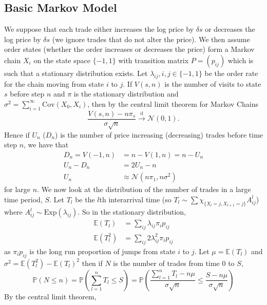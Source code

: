 \documentclass[a4paper,10pt]{article}
\begin{document}
\subsection{Basic Markov Model}
We suppose that each trade either increases the log price by $\delta s$ or decreases the log price by $\delta s$ (we ignore trades that do not alter the price). We then assume order states (whether the order increases or decreases the price) form a Markov chain $X_i$ on the state space $\{-1, 1\}$ with transition matrix $P = (p_{ij})$ which is such that a stationary distribution exists. Let $\lambda_{ij}, i,j \in \{-1, 1\}$ be the order rate for the chain moving from state $i$ to $j$. If $V(s, n)$ is the number of visits to state $s$ before step $n$ and $\pi$ is the stationary distribution and $\sigma^2 = \sum_{i=1}^{\infty}\text{Cov}(X_0, X_i)$, then by the central limit theorem for Markov Chains \cite{markovclt}
\begin{equation}
\frac{V(s, n) - n\pi_s}{\sigma \sqrt{n}} \xrightarrow{\text{d}} \mathcal{N}(0, 1).
\end{equation}
Hence if $U_n$ ($D_n$) is the number of price increasing (decreasing) trades before time step $n$, we have that
\begin{align}
D_n = V(-1, n) &= n - V(1, n) = n - U_n \\
U_n - D_n &= 2U_n - n \\
U_n &\approx  \mathcal{N}(n\pi_1, n\sigma^2)
\end{align}
for large $n$. 
We now look at the distribution of the number of trades in a large time period, $S$. Let $T_l$ be the $l$th interarrival time (so $T_l \sim \sum \chi_{\{X_l = j, X_{l + 1} = j\}} A_{ij}^l $) where $A_{ij}^l \sim \text{Exp}(\lambda_{ij})$. So in the stationary distribution,
\begin{align}
\mathbb{E}(T_l) &= \sum_{ij} \lambda_{ij}\pi_{i}p_{ij}\\
\mathbb{E}(T_l^2) &=  \sum_{ij} 2\lambda_{ij}^2\pi_{i}p_{ij}
\end{align}
as $\pi_i p_{ij}$ is the long run proportion of jumps from state $i$ to $j$. Let $\mu = \mathbb{E}(T_l)$ and $\sigma^2 = \mathbb{E}(T_l^2) - \mathbb{E}(T_l)^2$ then if $N$ is the number of trades from time $0$ to $S$,
\begin{equation}
\mathbb{P}(N \leq n) = \mathbb{P}\left(\sum_{l=1}^n T_l \leq S\right) = \mathbb{P}\left(\frac{\sum_{l=1}^n T_l - n\mu}{\sigma \sqrt{n}} \leq \frac{S - n\mu}{\sigma \sqrt{n}} \right) 
\end{equation}
By the central limit theorem, 
\end{document}
